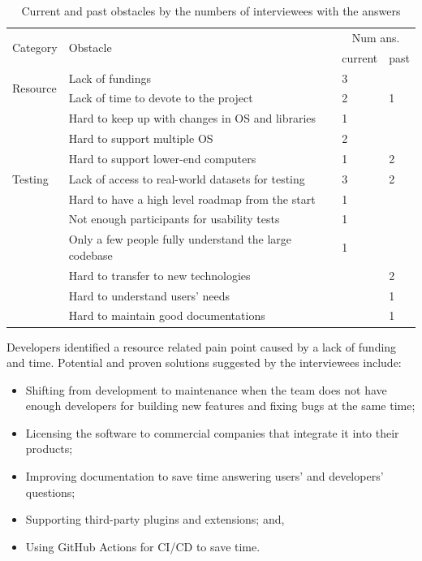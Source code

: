 \documentclass[final, 3p, times, authoryear]{elsarticle}
\begin{document}
\begin{table}[!ht]
\centering
\begin{tabular}{llll}
\hline
\multirow{2}{*}{Category} & \multirow{2}{*}{Obstacle} & \multicolumn{2}{c}{Num ans.} \\ \cline{3-4} 
 &  & current & past \\ \hline
\multirow{2}{*}{Resource} & Lack of fundings & 3 &  \\
 & Lack of time to devote to the project & 2 & 1 \\ \hdashline
\multirow{3}{*}{Balance} & Hard to keep up with changes in OS and libraries & 1 &  \\
 & Hard to support multiple OS & 2 &  \\
 & Hard to support lower-end computers & 1 & 2 \\ \hdashline
Testing & Lack of access to real-world datasets for testing & 3 & 2 \\ \hdashline
\multirow{7}{*}{Others}
 & Hard to have a high level roadmap from the start & 1 &  \\
 & Not enough participants for usability tests & 1 &  \\
 & Only a few people fully understand the large codebase & 1 &  \\
 & Hard to transfer to new technologies & & 2 \\
 & Hard to understand users' needs & & 1 \\
 & Hard to maintain good documentations & & 1 \\ \hline
\end{tabular}
\caption{\label{tab_obstacles}Current and past obstacles by the numbers of interviewees with the answers}
\end{table}

Developers identified a resource related pain point caused by a lack of funding
and time.  Potential and proven solutions suggested by the interviewees include:

\begin{itemize}
\item Shifting from development to maintenance when the team does not have
enough developers for building new features and fixing bugs at the same time;
\item Licensing the software to commercial companies that integrate it into
their products;
\item Improving documentation to save time answering users' and developers'
questions;
\item Supporting third-party plugins and extensions; and,
\item Using GitHub Actions for CI/CD to save time.
\end{itemize}
\end{document}
